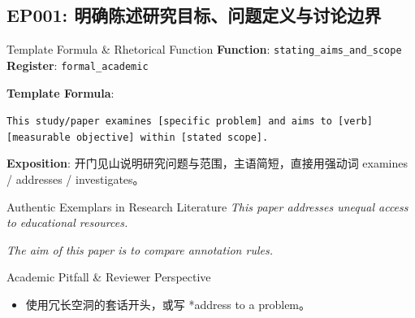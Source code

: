 \subsection{EP001: 明确陈述研究目标、问题定义与讨论边界}\label{sec:ep:EP001}
\begin{ConceptBox}{Template Formula \& Rhetorical Function}
\textbf{Function}: \texttt{stating\_aims\_and\_scope} \quad \textbf{Register}: \texttt{formal\_academic}\par\vspace{3pt}
\textbf{Template Formula}:\par\noindent\texttt{This study/paper examines [specific problem] and aims to [verb] [measurable objective] within [stated scope].}\par\vspace{4pt}
\textbf{Exposition}: 开门见山说明研究问题与范围，主语简短，直接用强动词 examines / addresses / investigates。
\end{ConceptBox}
\begin{ExampleBox}{Authentic Exemplars in Research Literature}
\textit{This paper addresses unequal access to educational resources.}\par\vspace{2pt}
\textit{The aim of this paper is to compare annotation rules.}\par\vspace{2pt}
\end{ExampleBox}
\begin{TipBox}{Academic Pitfall \& Reviewer Perspective}
\begin{itemize}[leftmargin=1.5em, itemsep=1pt]
  \item 使用冗长空洞的套话开头，或写 *address to a problem。
\end{itemize}
\end{TipBox}
\vspace{6pt}
